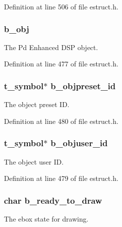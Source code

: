 Definition at line 506 of file estruct.\-h.

\hypertarget{struct__edspbox_a8a991907db2d274664740c5f19569148}{
\subsubsection[{b\-\_\-obj}]{ b\-\_\-obj}}\label{struct__edspbox_a8a991907db2d274664740c5f19569148}
The Pd Enhanced D\-S\-P object. 

Definition at line 477 of file estruct.\-h.

\hypertarget{struct__edspbox_adc377263d208d1051f4a0997868b1155}{
\subsubsection[{b\-\_\-objpreset\-\_\-id}]{\setlength{\rightskip}{0pt plus 5cm}t\-\_\-symbol$\ast$ b\-\_\-objpreset\-\_\-id}}\label{struct__edspbox_adc377263d208d1051f4a0997868b1155}
The object preset I\-D. 

Definition at line 480 of file estruct.\-h.

\hypertarget{struct__edspbox_ae324f65e10196cc7e166652e8d7d394d}{
\subsubsection[{b\-\_\-objuser\-\_\-id}]{\setlength{\rightskip}{0pt plus 5cm}t\-\_\-symbol$\ast$ b\-\_\-objuser\-\_\-id}}\label{struct__edspbox_ae324f65e10196cc7e166652e8d7d394d}
The object user I\-D. 

Definition at line 479 of file estruct.\-h.

\hypertarget{struct__edspbox_a234ea03e103bd45f5fa1d27b8e69b5dd}{
\subsubsection[{b\-\_\-ready\-\_\-to\-\_\-draw}]{\setlength{\rightskip}{0pt plus 5cm}char b\-\_\-ready\-\_\-to\-\_\-draw}}\label{struct__edspbox_a234ea03e103bd45f5fa1d27b8e69b5dd}
The ebox state for drawing. 

